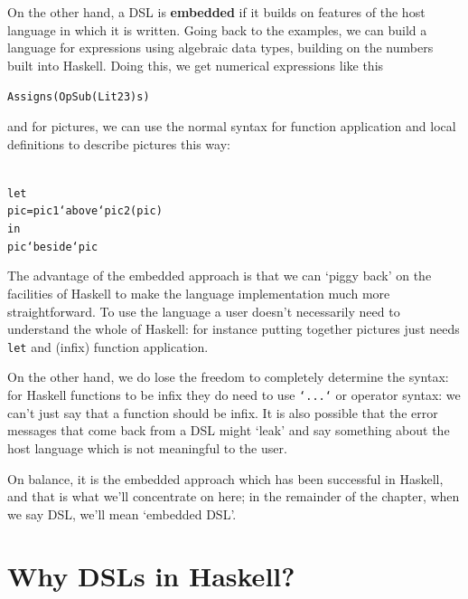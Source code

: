 On the other hand, a DSL is  \textbf{embedded} if it builds on features of the 
host language in which it is written. Going back to the examples, we can build a language for expressions using algebraic data types, building on the numbers built into Haskell. Doing this, we get numerical expressions like this
\begin{alltt}
Assign s (Op Sub (Lit 23) s)
\end{alltt}
and for pictures, we can use the normal syntax for function application and local definitions to describe pictures this way:
\begin{alltt}\label{localPicDef}
let 
  pic = pic1 `above` pic2 \hfill{(pic)}
in 
  pic `beside` pic
\end{alltt}
The advantage of the embedded approach is that we can `piggy back' on the facilities of Haskell to make the language implementation much more straightforward. To use the language a user doesn't necessarily need to understand the whole of Haskell: for instance putting together pictures just needs \texttt{let} and (infix) function application.

On the other hand, we do lose the freedom to completely determine the syntax: for Haskell functions to be infix they do need to use \texttt{`...`} or operator syntax: we can't just say that a function should be infix. It is also possible that the error messages that come back from a DSL might `leak' and say something about the host language which is not meaningful to the user. 

On balance, it is the embedded approach which has been successful in Haskell, and that is what we'll concentrate on here; in the remainder of the chapter, when we say DSL, we'll mean `embedded DSL'.

\section{Why DSLs in Haskell?}

